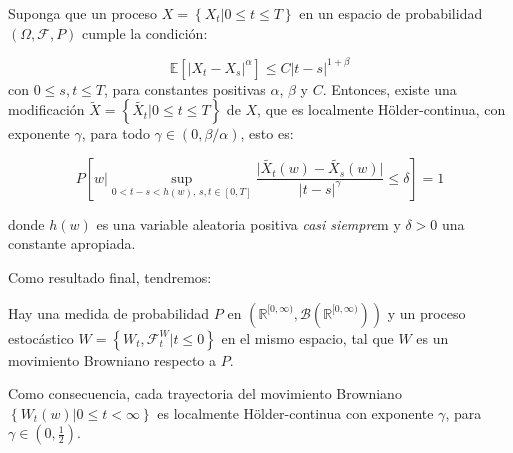 \begin{theorem}
	Suponga que un proceso $X = \left\{  X_t \vert 0 \leq t \leq T \right\}$ en un espacio de probabilidad $(\Omega, \mathcal{F}, P)$ cumple la condición:

	\[
		\mathbb{E}[ \lvert X_t - X_s \rvert^{\alpha} ] \leq C \lvert t - s \rvert^{ 1 + \beta}
	\]
	con $0 \leq s, t \leq T$, para constantes positivas $\alpha$, $\beta$ y $C$. Entonces, existe una modificación $\tilde{X} = \left\{ \tilde{X_t} \vert  0 \leq t \leq T  \right\}$ de $X$, que es localmente Hölder-continua, con exponente $\gamma$, para todo $\gamma \in (0, \beta / \alpha)$, esto es:

	\[
		P \left[ w \vert \sup_{  0 < t - s < h(w)\text{, } s,t\in [0,T]}  \frac{\lvert  \tilde{X_t}(w) - \tilde{X_s}(w) \rvert }{\lvert t - s \rvert^{\gamma}}  \leq \delta \right] = 1
	\]

	donde $h(w)$ es una variable aleatoria positiva \textit{casi siempre}m y $\delta > 0$ una constante apropiada.

\end{theorem}

Como resultado final, tendremos:

\begin{coro}
	Hay una medida de probabilidad $P$ en $(\mathbb{R}^{ [0, \infty) }, \mathcal{B}(\mathbb{R}^{ [0, \infty) })  )$ y un proceso estocástico $W = \left\{ W_t, \mathcal{F}_t^W \vert t \leq 0 \right\}$ en el mismo espacio, tal que $W$ es un movimiento Browniano respecto a $P$.
\end{coro}

Como consecuencia, cada trayectoria del movimiento Browniano $\left\{ W_t(w) \vert 0 \leq t < \infty \right\}$ es localmente Hölder-continua con exponente $\gamma$, para $\gamma \in \left(0, \frac{1}{2}\right)$.